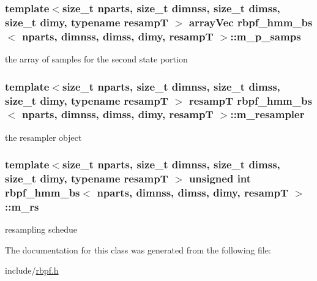 \subsubsection[{\texorpdfstring{m\+\_\+p\+\_\+samps}{m_p_samps}}]{\setlength{\rightskip}{0pt plus 5cm}template$<$size\+\_\+t nparts, size\+\_\+t dimnss, size\+\_\+t dimss, size\+\_\+t dimy, typename resampT $>$ {\bf array\+Vec} {\bf rbpf\+\_\+hmm\+\_\+bs}$<$ nparts, dimnss, dimss, dimy, resampT $>$\+::m\+\_\+p\+\_\+samps\hspace{0.3cm}{\ttfamily [private]}}\hypertarget{classrbpf__hmm__bs_a51c48b58b2be3a82a61fed0f1a44f06d}{}\label{classrbpf__hmm__bs_a51c48b58b2be3a82a61fed0f1a44f06d}
the array of samples for the second state portion 
\subsubsection[{\texorpdfstring{m\+\_\+resampler}{m_resampler}}]{\setlength{\rightskip}{0pt plus 5cm}template$<$size\+\_\+t nparts, size\+\_\+t dimnss, size\+\_\+t dimss, size\+\_\+t dimy, typename resampT $>$ resampT {\bf rbpf\+\_\+hmm\+\_\+bs}$<$ nparts, dimnss, dimss, dimy, resampT $>$\+::m\+\_\+resampler\hspace{0.3cm}{\ttfamily [private]}}\hypertarget{classrbpf__hmm__bs_a164a9d81ede5be6a9ca0dd33cdffb3c0}{}\label{classrbpf__hmm__bs_a164a9d81ede5be6a9ca0dd33cdffb3c0}
the resampler object 
\subsubsection[{\texorpdfstring{m\+\_\+rs}{m_rs}}]{\setlength{\rightskip}{0pt plus 5cm}template$<$size\+\_\+t nparts, size\+\_\+t dimnss, size\+\_\+t dimss, size\+\_\+t dimy, typename resampT $>$ unsigned int {\bf rbpf\+\_\+hmm\+\_\+bs}$<$ nparts, dimnss, dimss, dimy, resampT $>$\+::m\+\_\+rs\hspace{0.3cm}{\ttfamily [private]}}\hypertarget{classrbpf__hmm__bs_a0b81a949e21d9c1f3c1dcb5c6c4840e2}{}\label{classrbpf__hmm__bs_a0b81a949e21d9c1f3c1dcb5c6c4840e2}
resampling schedue 

The documentation for this class was generated from the following file\+:\begin{DoxyCompactItemize}
\item 
include/\hyperlink{rbpf_8h}{rbpf.\+h}\end{DoxyCompactItemize}
